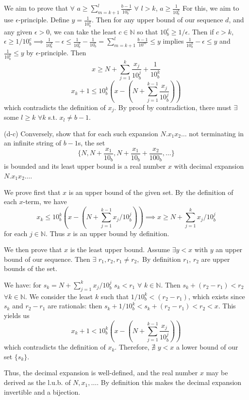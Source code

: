 \documentclass{amsart}
\begin{document}
\medskip
\noindent We aim to prove that $\forall$ $a\geq\sum\limits^l_{m=k+1}\frac{b-1}{10_b^m}$ $\forall$ $l>k$, $a\geq\frac{1}{10_b^k}$ For this, we aim 
to use $\epsilon$-principle. Define $y = \frac{1}{10_b^k}$. Then for any upper bound of our sequence $d$, and any given $\epsilon>0$, we can
take the least $c\in\mathbb{N}$ so that $10_b^c\geq1/\epsilon$. Then if $c>k$, $\epsilon\geq1/10_b^c\implies
\frac{1}{10_b^k}-\epsilon\leq\frac{1}{10_b^k}-\frac{1}{10_b^c}=\sum\limits^l_{m=k+1}\frac{b-1}{10^m}\leq y$ implies $\frac{1}{10_b^k}-\epsilon\leq y$
and $\frac{1}{10_b^k} \leq y$ by $\epsilon$-principle. Then $$x\geq N+\sum\limits^k_{j=1}\frac{x_j}{10_b^j}+\frac{1}{10_b^k}$$ 
$$x_k+1\leq 10_b^k(x-(N+\sum\limits_{j=1}^{k-1}\frac{x_j}{10_b^j}))$$ which contradicts the definition of $x_j$. By proof by 
contradiction, there must $\exists$ some $l\geq k$ $\forall k$ s.t. $x_l\neq b-1$. 


\bigskip

\indent (d-c) Conversely, show that for each such expansion $N.x_1x_2\dots$ not terminating in an infinite
string of $b-1$s, the set $$\{N, N+\frac{x_1}{10_b}, N+\frac{x_1}{10_b}+\frac{x_2}{100_b}, \dots\}$$ is bounded 
and its least upper bound is a real number $x$ with decimal expansion $N.x_1x_2\dots$.

\noindent We prove first that $x$ is an upper bound of the given set. By the definition of each $x$-term, we have 
$$x_k\leq 10_b^k(x-(N+\sum\limits_{j=1}^{k-1}x_j/10_b^j))\implies x\geq N+\sum_{j=1}^{k}x_j/10_b^j$$ for each 
$j\in\mathbb{N}$. Thus $x$ is an upper bound by definition. 

\medskip
\noindent We then prove that $x$ is the least upper bound. Assume $\exists y<x$ with $y$ an upper bound of
our sequence. Then $\exists$ $r_1, r_2, r_1\neq r_2,$ By definition $r_1$, $r_2$ are upper bounds of the set.

\medskip
\noindent We have: for $s_k = N+\sum_{j=1}^{k}x_j/10_b^j$ $s_k<r_1$ $\forall$ $k\in\mathbb{N}$. Then 
$s_k + (r_2-r_1)< r_2$ $\forall k\in\mathbb{N}$. We consider the least $k$ such that $1/10_b^k<(r_2-r_1)$, which exists
since $s_k$ and $r_2-r_1$ are rationals: then $s_k + 1/10_b^k<s_k+(r_2-r_1)<r_2<x$. This yields us 
$$x_k+1< 10_b^k(x-(N+\sum^{k-1}_{j=1} \frac{x_j}{10_b^j}))$$ which contradicts the definition of $x_k$. Therefore, $\nexists$
$y<x$ a lower bound of our set $\{s_k\}$.


\noindent Thus, the decimal expansion is well-defined, and the real number $x$ may be derived as the l.u.b. of $N, x_1,\dots$.
By definition this makes the decimal expansion invertible and a bijection.
\end{document}

